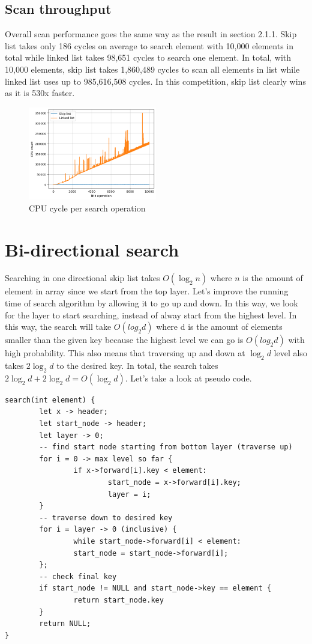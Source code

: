 \documentclass[a4paper, 12pt]{report}
\begin{document}
\subsection{Scan throughput}
Overall scan performance goes the same way as the result in section 2.1.1. Skip list takes only 186 cycles on average to search element with 10,000 elements in total
while linked list takes 98,651 cycles to search one element. In total, with 10,000 elements, skip list takes 1,860,489 cycles to scan all elements in list while linked list
uses up to 985,616,508 cycles. In this competition, skip list clearly wins as it is 530x faster.

\begin{figure}[h]
        \centering
        \includegraphics[width=0.5\textwidth,scale=0.5]{skip_list_scan.png}
        \caption{\label{fig:skip_list_scan} CPU cycle per search operation}
\end{figure}

\section{Bi-directional search}

Searching in one directional skip list takes $O(\log_2 n)$ where $n$ is the amount of element in array since we start from the top layer.
Let's improve the running time of search algorithm by allowing it to go up and down. In this way, we look for the layer to start searching, 
instead of alway start from the highest level. In this way, the search will take $O(log_2 d)$ where d is the amount of elements smaller than the given key
because the highest level we can go is $O(log_2 d)$ with high probability. This also means that traversing up and down at $\log_2 d$ level also takes 
$2\log_2 d$ to the desired key. In total, the search takes $2\log_2 d + 2\log_2 d = O(\log_2 d)$. Let's take a look at pseudo code.

\begin{verbatim}
search(int element) {
        let x -> header;
        let start_node -> header;
        let layer -> 0;
        -- find start node starting from bottom layer (traverse up)
        for i = 0 -> max level so far {
                if x->forward[i].key < element:
                        start_node = x->forward[i].key;
                        layer = i;
        }
        -- traverse down to desired key
        for i = layer -> 0 (inclusive) {
                while start_node->forward[i] < element:
                start_node = start_node->forward[i];
        };
        -- check final key
        if start_node != NULL and start_node->key == element {
                return start_node.key
        }
        return NULL;
}
\end{verbatim}
\end{document}
